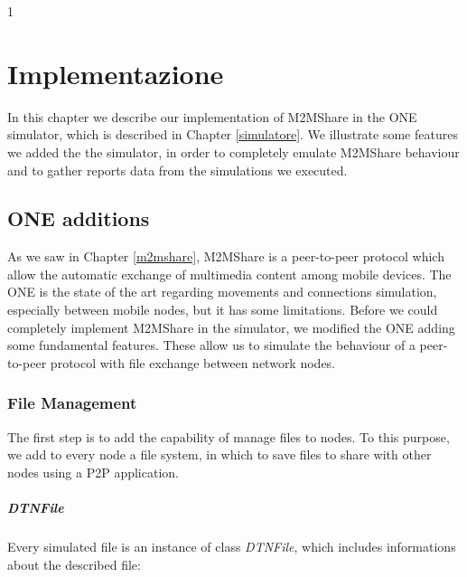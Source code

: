 
1\chapter{Implementazione}\label{implementazione} %



\graphicspath{{6-implementazione/img/}}


In this chapter we describe our implementation of M2MShare in the ONE simulator, which is described in Chapter \ref{simulatore}. We illustrate some features we added the the simulator, in order to completely emulate M2MShare behaviour and to gather reports data from the simulations we executed.
  

\section{ONE additions}
As we saw in Chapter \ref{m2mshare}, M2MShare is a peer-to-peer protocol which allow the automatic exchange of multimedia content among mobile devices. The ONE is the state of the art regarding movements and connections simulation, especially between mobile nodes, but it has some limitations. Before we could completely implement M2MShare in the simulator, we modified the ONE adding some fundamental features. These allow us to simulate the behaviour of a peer-to-peer protocol with file exchange between network nodes.


\subsection{File Management}
The first step is to add the capability of manage files to nodes. To this purpose, we add to every node a file system, in which to save files to share with other nodes using a P2P application. 


\paragraph{DTNFile}
Every simulated file is an instance of class \textit{DTNFile}, which includes informations about the described file:

